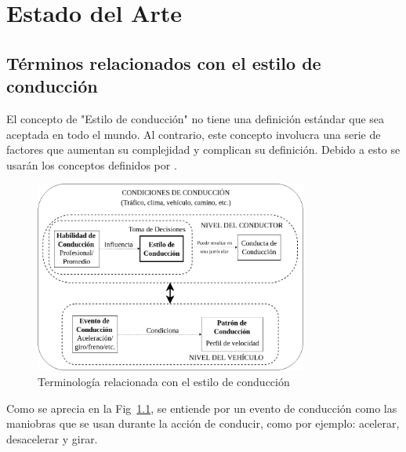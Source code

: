 
\chapter{Estado del Arte}

\ifpdf
    \graphicspath{{Chapter2/Figs/Raster/}{Chapter2/Figs/PDF/}{Chapter2/Figs/}}
\else
    \graphicspath{{Chapter2/Figs/Vector/}{Chapter2/Figs/}}
\fi

\section{Términos relacionados con el estilo de conducción}

El concepto de "Estilo de conducción" no tiene una definición estándar que sea aceptada en todo el mundo. Al contrario, este concepto involucra una serie de factores que aumentan su complejidad y complican su definición. Debido a esto se usarán los conceptos definidos por \citeauthor{8002632} \cite{8002632}.

\begin{figure}[htbp!]
\centering
\includegraphics[width=0.8\textwidth]{Fig1}
\caption[Terminología estilo de conducción]{Terminología relacionada con el estilo de conducción \cite{8002632}}
\label{fig:2.1}
\end{figure}

Como se aprecia en la Fig~\ref{fig:2.1}, se entiende por un evento de conducción como las maniobras que se usan durante la acción de conducir, como por ejemplo: acelerar, desacelerar y girar.

